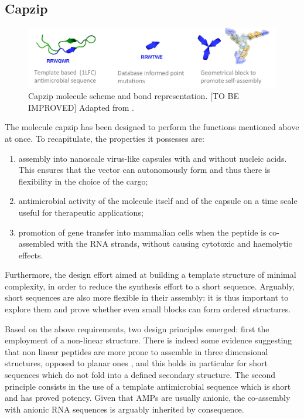 \subsection{Capzip} \label{sec:capzip}

\begin{figure}
\begin{center}
\includegraphics[width = \textwidth]{pics/capzip.png}
\caption[Cazip molecule]{Capzip molecule scheme and bond representation. [TO BE IMPROVED] Adapted from \cite{Castelletto2016}.} \label{fig:capzip}
\end{center}
\end{figure}

The molecule capzip has been designed to perform the functions mentioned above at once. To recapitulate, the properties it possesses are:
\begin{enumerate}
\item assembly into nanoscale virus-like capsules with and without nucleic acids. This ensures that the vector can autonomously form and thus there is flexibility in the choice of the cargo;
\item antimicrobial activity of the molecule itself and of the capsule on a time scale useful for therapeutic applications;
\item promotion of gene transfer into mammalian cells when the peptide is co-assembled with the RNA strands, without causing cytotoxic and haemolytic effects.
\end{enumerate}
%
Furthermore, the design effort aimed at building a template structure of minimal complexity, in order to reduce the synthesis effort to a short sequence. Arguably, short sequences are also more flexible in their assembly: it is thus important to explore them and prove whether even small blocks can form ordered structures.

Based on the above requirements, two design principles emerged: first the employment of a non-linear structure. There is indeed some evidence suggesting that non linear peptides are more prone to assemble in three dimensional structures, opposed to planar ones \cite{???}, and this holds in particular for short sequences which do not fold into a defined secondary structure.
%
The second principle consists in the use of a template antimicrobial sequence which is short and has proved potency.
%
Given that AMPs are usually anionic, the co-assembly with anionic RNA sequences is arguably inherited by consequence.

